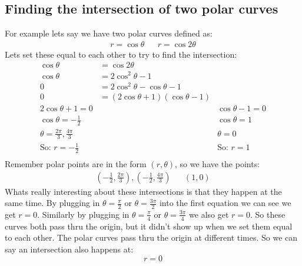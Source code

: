 \documentclass{report}
\begin{document}
    \subsection{Finding the intersection of two polar curves}
        For example lets say we have two polar curves defined as:
        \begin{align*}
            r = \cos \theta &&
            r = \cos 2 \theta
        \end{align*}
        Lets set these equal to each other to try to find the intersection:
        \begin{align*}
            \cos \theta &= \cos 2 \theta \\
            \cos \theta &= 2 \cos^2 \theta - 1 \\
            0 &= 2 \cos^2 \theta - \cos \theta - 1 \\
            0 &= (2 \cos \theta + 1)(\cos \theta - 1) \\
            2 \cos \theta + 1 = 0 &&
            \cos \theta - 1 = 0 \\
            \cos \theta = - \frac{1}{2} &&
            \cos \theta = 1 \\
            \theta = \frac{2 \pi}{3}, \frac{4 \pi}{3} &&
            \theta = 0 \\
            \text{So: } r = - \frac{1}{2} &&
            \text{So: } r = 1 \\
        \end{align*}
        Remember polar points are in the form \((r, \theta)\), so we have the points:
        \begin{align*}
            (- \frac{1}{2},\frac{2 \pi}{3}), (- \frac{1}{2},\frac{4 \pi}{3}) &&
            (1,0)
        \end{align*}
        Whats really interesting about these intersections is that they happen at the same time. 
        By plugging in \(\theta = \frac{\pi}{2}\) or \(\theta = \frac{3 \pi}{2}\) into the first equation we can see we get \(r = 0\).
        Similarly by plugging in \(\theta = \frac{\pi}{4}\) or \(\theta = \frac{3\pi}{4}\) we also get \(r = 0\). 
        So these curves both pass thru the origin, but it didn't show up when we set them equal to each other.
        The polar curves pass thru the origin at different times.
        So we can say an intersection also happens at:
        \[r = 0\]
\end{document}
